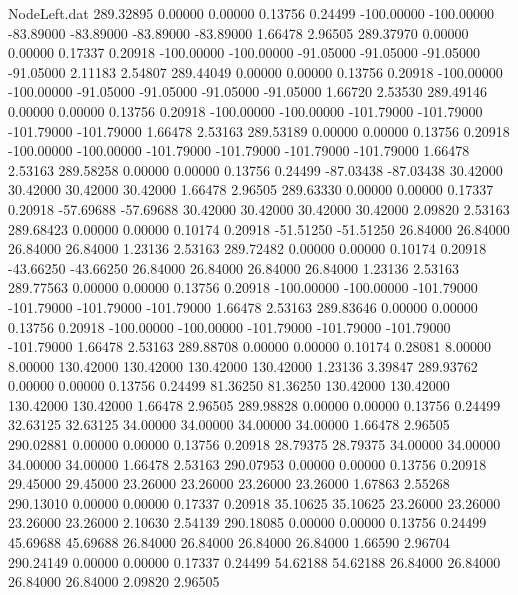 \begin{filecontents}{NodeLeft.dat}
 289.32895    0.00000    0.00000     0.13756    0.24499 -100.00000 -100.00000  -83.89000  -83.89000  -83.89000  -83.89000    1.66478    2.96505
 289.37970    0.00000    0.00000     0.17337    0.20918 -100.00000 -100.00000  -91.05000  -91.05000  -91.05000  -91.05000    2.11183    2.54807
 289.44049    0.00000    0.00000     0.13756    0.20918 -100.00000 -100.00000  -91.05000  -91.05000  -91.05000  -91.05000    1.66720    2.53530
 289.49146    0.00000    0.00000     0.13756    0.20918 -100.00000 -100.00000 -101.79000 -101.79000 -101.79000 -101.79000    1.66478    2.53163
 289.53189    0.00000    0.00000     0.13756    0.20918 -100.00000 -100.00000 -101.79000 -101.79000 -101.79000 -101.79000    1.66478    2.53163
 289.58258    0.00000    0.00000     0.13756    0.24499  -87.03438  -87.03438   30.42000   30.42000   30.42000   30.42000    1.66478    2.96505
 289.63330    0.00000    0.00000     0.17337    0.20918  -57.69688  -57.69688   30.42000   30.42000   30.42000   30.42000    2.09820    2.53163
 289.68423    0.00000    0.00000     0.10174    0.20918  -51.51250  -51.51250   26.84000   26.84000   26.84000   26.84000    1.23136    2.53163
 289.72482    0.00000    0.00000     0.10174    0.20918  -43.66250  -43.66250   26.84000   26.84000   26.84000   26.84000    1.23136    2.53163
 289.77563    0.00000    0.00000     0.13756    0.20918 -100.00000 -100.00000 -101.79000 -101.79000 -101.79000 -101.79000    1.66478    2.53163
 289.83646    0.00000    0.00000     0.13756    0.20918 -100.00000 -100.00000 -101.79000 -101.79000 -101.79000 -101.79000    1.66478    2.53163
 289.88708    0.00000    0.00000     0.10174    0.28081    8.00000    8.00000  130.42000  130.42000  130.42000  130.42000    1.23136    3.39847
 289.93762    0.00000    0.00000     0.13756    0.24499   81.36250   81.36250  130.42000  130.42000  130.42000  130.42000    1.66478    2.96505
 289.98828    0.00000    0.00000     0.13756    0.24499   32.63125   32.63125   34.00000   34.00000   34.00000   34.00000    1.66478    2.96505
 290.02881    0.00000    0.00000     0.13756    0.20918   28.79375   28.79375   34.00000   34.00000   34.00000   34.00000    1.66478    2.53163
 290.07953    0.00000    0.00000     0.13756    0.20918   29.45000   29.45000   23.26000   23.26000   23.26000   23.26000    1.67863    2.55268
 290.13010    0.00000    0.00000     0.17337    0.20918   35.10625   35.10625   23.26000   23.26000   23.26000   23.26000    2.10630    2.54139
 290.18085    0.00000    0.00000     0.13756    0.24499   45.69688   45.69688   26.84000   26.84000   26.84000   26.84000    1.66590    2.96704
 290.24149    0.00000    0.00000     0.17337    0.24499   54.62188   54.62188   26.84000   26.84000   26.84000   26.84000    2.09820    2.96505

\end{filecontents}
